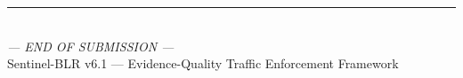 \documentclass[11pt,a4paper]{article}
\begin{document}
\vspace{2em}
\begin{center}
    \rule{0.5\linewidth}{0.4pt}\\[0.5em]
    {\small\textit{--- END OF SUBMISSION ---}}\\[0.3em]
    {\small Sentinel-BLR v6.1 --- Evidence-Quality Traffic Enforcement Framework}
\end{center}
\end{document}
